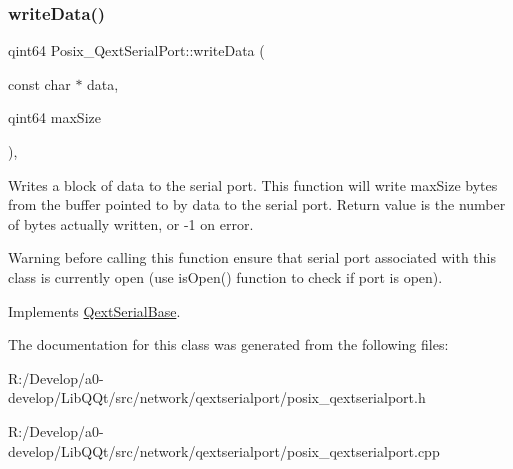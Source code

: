 \subsubsection{\texorpdfstring{write\+Data()}{writeData()}}
{\footnotesize\ttfamily qint64 Posix\+\_\+\+Qext\+Serial\+Port\+::write\+Data (\begin{DoxyParamCaption}\item[{const char $\ast$}]{data,  }\item[{qint64}]{max\+Size }\end{DoxyParamCaption})\hspace{0.3cm}{\ttfamily [protected]}, {\ttfamily [virtual]}}

Writes a block of data to the serial port. This function will write max\+Size bytes from the buffer pointed to by data to the serial port. Return value is the number of bytes actually written, or -\/1 on error.

\begin{DoxyWarning}{Warning}
before calling this function ensure that serial port associated with this class is currently open (use is\+Open() function to check if port is open). 
\end{DoxyWarning}


Implements \mbox{\hyperlink{class_qext_serial_base}{Qext\+Serial\+Base}}.



The documentation for this class was generated from the following files\+:\begin{DoxyCompactItemize}
\item 
R\+:/\+Develop/a0-\/develop/\+Lib\+Q\+Qt/src/network/qextserialport/posix\+\_\+qextserialport.\+h\item 
R\+:/\+Develop/a0-\/develop/\+Lib\+Q\+Qt/src/network/qextserialport/posix\+\_\+qextserialport.\+cpp\end{DoxyCompactItemize}
